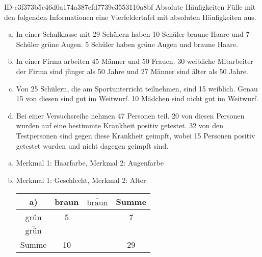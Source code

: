 \begin{exercise}
      {ID-c3f373b5c46d0a174a387efd7739c3553110a8bf}
      {Absolute Häufigkeiten}
  \ifproblem\problem
    Fülle mit den folgenden Informationen eine Vierfeldertafel mit
    absoluten Häufigkeiten aus.
    \begin{enumerate}[a)]
      \item In einer Schulklasse mit 29 Schülern haben 10 Schüler braune Haare
            und 7 Schüler grüne Augen. 5 Schüler haben grüne Augen und braune Haare.
      \item In einer Firma arbeiten 45 Männer und 50 Frauen. 30 weibliche Mitarbeiter
            der Firma sind jünger als 50 Jahre und 27 Männer sind älter als 50 Jahre.
      \item Von 25 Schülern, die am Sportunterricht teilnehmen, sind 15 weiblich.
            Genau 15 von diesen sind gut im Weitwurf.
            10 Mädchen sind nicht gut im Weitwurf.
      \item Bei einer Versuchsreihe nehmen 47 Personen teil. 20 von diesen Personen
            wurden auf eine bestimmte Krankheit positiv getestet. 32 von den
            Testpersonen sind gegen diese Krankheit geimpft, wobei 15 Personen
            positiv getestet wurden und nicht dagegen geimpft sind.
    \end{enumerate}
  \fi
  \ifoutline\outline
    \begin{enumerate}[a)]
      \item Merkmal 1: Haarfarbe, Merkmal 2: Augenfarbe
      \item Merkmal 1: Geschlecht, Merkmal 2: Alter
        \begin{center}
          \begingroup
            \newcommand{\attribApos}{braun}%
            \newcommand{\attribAneg}{$\overline{\text{braun}}$}%
            \newcommand{\attribBpos}{grün}%
            \newcommand{\attribBneg}{$\overline{\text{grün}}$}%
            \renewcommand{\arraystretch}{1.25}%
            \begin{tabular}{|c||c|c||c|}
              \hline
              a)          & \attribApos & \attribAneg & Summe \\
              \hline
              \hline
              \attribBpos & 5           &             & 7     \\
              \hline
              \attribBneg &             &             &       \\
              \hline
              \hline
              Summe       & 10          &             & 29    \\

\end{tabular}
\end{center}
\end{enumerate}
\end{exercise}
